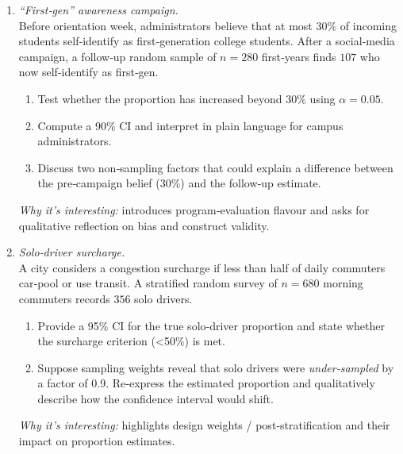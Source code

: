 \documentclass[11pt]{article}
\begin{document}
\begin{enumerate}[label=\textbf{Q\,\arabic*:}, start=6, left=0pt]
\item  \emph{“First‑gen” awareness campaign.}  \\
      Before orientation week, administrators believe that at most 30\% of incoming students self‑identify as first‑generation college students.
      After a social‑media campaign, a follow‑up random sample of $n=280$ first‑years finds $107$ who now self‑identify as first‑gen.
      \begin{enumerate}[label=(\alph*)]
          \item Test whether the proportion has increased beyond 30\% using $\alpha=0.05$.
          \item Compute a 90\% CI and interpret in plain language for campus administrators.
          \item Discuss two non‑sampling factors that could explain a difference between the pre‑campaign belief (30\%) and the follow‑up estimate.
      \end{enumerate}
      \textit{Why it’s interesting:} introduces program‐evaluation flavour and asks for qualitative reflection on bias and construct validity.

\item  \emph{Solo‑driver surcharge.}  \\
      A city considers a congestion surcharge if less than half of daily commuters car‑pool or use transit.
      A stratified random survey of $n=680$ morning commuters records $356$ solo drivers.
      \begin{enumerate}[label=(\alph*)]
          \item Provide a 95\% CI for the true solo‑driver proportion and state whether the surcharge criterion (<50\%) is met.
          \item Suppose sampling weights reveal that solo drivers were \emph{under‑sampled} by a factor of 0.9.
                Re‑express the estimated proportion and qualitatively describe how the confidence interval would shift.
      \end{enumerate}
      \textit{Why it’s interesting:} highlights design weights / post‑stratification and their impact on proportion estimates.


\end{enumerate}
\end{document}
